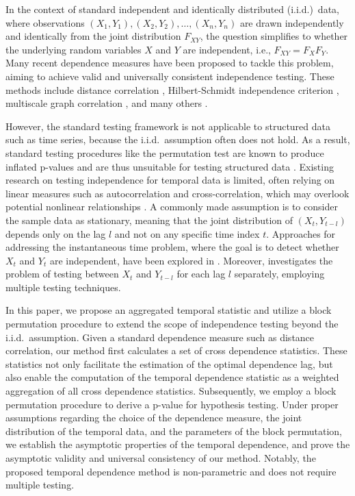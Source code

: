 In the context of standard independent and identically distributed (i.i.d.)~data, where observations $(X_1, Y_1), (X_2, Y_2), \ldots, (X_n, Y_n)$ are drawn independently and identically from the joint distribution $F_{XY}$, the question simplifies to whether the underlying random variables $X$ and $Y$ are independent, i.e., $F_{XY}=F_{X}F_{Y}$. Many recent dependence measures have been proposed to tackle this problem, aiming to achieve valid and universally consistent independence testing. These methods include distance correlation \cite{szekely2007,SzekelyRizzo2009, SzekelyRizzo2014}, Hilbert-Schmidt independence criterion \cite{hsic,GrettonGyorfi2010,GrettonEtAl2012}, multiscale graph correlation \cite{mgc-elife, mgc-jasa,mgc3}, and many others \cite{HellerGorfine2013,Zhu2017,Pan2020}. 

However, the standard testing framework is not applicable to structured data such as time series, because the i.i.d.~assumption often does not hold. As a result, standard testing procedures like the permutation test are known to produce inflated p-values and are thus unsuitable for testing structured data \cite{Mantel2013, DiCiccio2017}. Existing research on testing independence for temporal data is limited, often relying on linear measures such as autocorrelation and cross-correlation, which may overlook potential nonlinear relationships \cite{hsicts}. A commonly made assumption is to consider the sample data as stationary, meaning that the joint distribution of $(X_t, Y_{t-l})$ depends only on the lag $l$ and not on any specific time index $t$. Approaches for addressing the instantaneous time problem, where the goal is to detect whether $X_t$ and $Y_t$ are independent, have been explored in \cite{shifthsic}. Moreover, \cite{wildhsic} investigates the problem of testing between $X_t$ and $Y_{t-l}$ for each lag $l$ separately, employing multiple testing techniques.

In this paper, we propose an aggregated temporal statistic and utilize a block permutation procedure to extend the scope of independence testing beyond the i.i.d.~assumption. Given a standard dependence measure such as distance correlation, our method first calculates a set of cross dependence statistics. These statistics not only facilitate the estimation of the optimal dependence lag, but also enable the computation of the temporal dependence statistic as a weighted aggregation of all cross dependence statistics. Subsequently, we employ a block permutation procedure to derive a p-value for hypothesis testing. Under proper assumptions regarding the choice of the dependence measure, the joint distribution of the temporal data, and the parameters of the block permutation, we establish the asymptotic properties of the temporal dependence, and prove the asymptotic validity and universal consistency of our method. Notably, the proposed temporal dependence method is non-parametric and does not require multiple testing.

